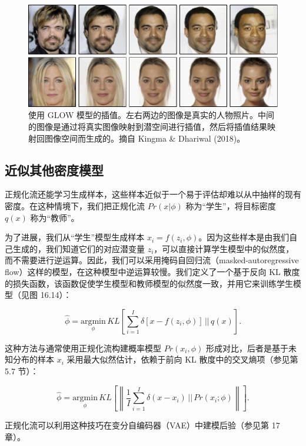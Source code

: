\documentclass[lang=cn,newtx,10pt,scheme=chinese]{elegantbook}
\begin{document}
\begin{figure}[ht!]
\centering
\includegraphics[width=0.7\linewidth]{PDFFigures/UDLChap16PDF/FlowGLOWInterp.pdf}
\caption{使用 GLOW 模型的插值。左右两边的图像是真实的人物照片。中间的图像是通过将真实图像映射到潜空间进行插值，然后将插值结果映射回图像空间而生成的。摘自 Kingma \& Dhariwal (2018)。}
\end{figure}


\subsection{近似其他密度模型}
正规化流还能学习生成样本，这些样本近似于一个易于评估却难以从中抽样的现有密度。在这种情境下，我们把正规化流 \(Pr(x|\phi)\) 称为“学生”，将目标密度 \(q(x)\) 称为“教师”。

为了进展，我们从“学生”模型生成样本 \(x_i = f(z_i, \phi)\)。因为这些样本是由我们自己生成的，我们知道它们的对应潜变量 \(z_i\)，可以直接计算学生模型中的似然度，而不需要进行逆运算。因此，我们可以采用掩码自回归流（masked-autoregressive flow）这样的模型，在这种模型中逆运算较慢。我们定义了一个基于反向 KL 散度的损失函数，该函数促使学生模型和教师模型的似然度一致，并用它来训练学生模型（见图 16.14）：

\begin{equation}
\hat{\phi} = \underset{\phi}{\text{argmin}} \, KL \left[ \sum_{i=1}^{I} \delta [x - f(z_i, \phi)] \, || \, q(x) \right]. 
\end{equation}


这种方法与通常使用正规化流构建概率模型 \(Pr(x_i, \phi)\) 形成对比，后者是基于未知分布的样本 \(x_i\) 采用最大似然估计，依赖于前向 KL 散度中的交叉熵项（参见第 5.7 节）：

\begin{equation}
\hat{\phi} = \underset{\phi}{\text{argmin}} \, KL \left[ \left\| \frac{1}{I} \sum_{i=1}^{I} \delta (x - x_i) \, || \, Pr(x_i; \phi) \right\| \right]. 
\end{equation}


正规化流可以利用这种技巧在变分自编码器（VAE）中建模后验（参见第 17 章）。
\end{document}
